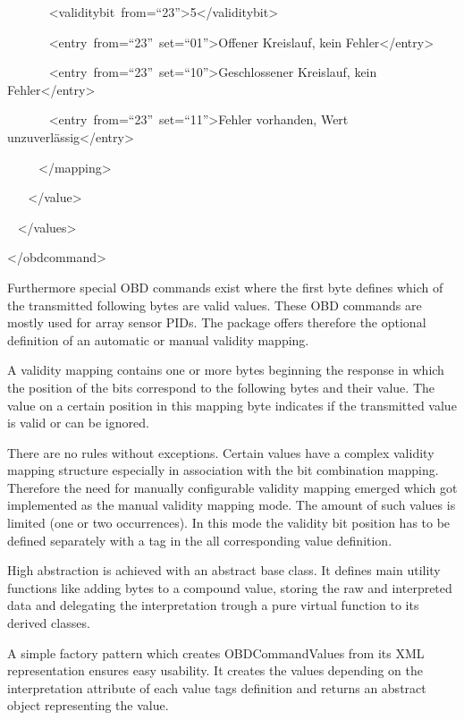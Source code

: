 {~ ~ ~ ~
}{\textless{}validitybit}{~}{from}{=}{``23''}{\textgreater{}}{5}{\textless{}/validitybit\textgreater{}}

{~ ~ ~ ~
}{\textless{}entry}{~}{from}{=}{``23''}{~}{set}{=}{``01''}{\textgreater{}}{Offener
Kreislauf, kein Fehler}{\textless{}/entry\textgreater{}}

{~ ~ ~ ~
}{\textless{}entry}{~}{from}{=}{``23''}{~}{set}{=}{``10''}{\textgreater{}}{Geschlossener
Kreislauf, kein Fehler}{\textless{}/entry\textgreater{}}

{~ ~ ~ ~
}{\textless{}entry}{~}{from}{=}{``23''}{~}{set}{=}{``11''}{\textgreater{}}{Fehler
vorhanden, Wert unzuverlässig}{\textless{}/entry\textgreater{}}

{~ ~ ~ }{\textless{}/mapping\textgreater{}}{~~~~~~~~~~~~~~~~}

{~ ~ }{\textless{}/value\textgreater{}}

{~ }{\textless{}/values\textgreater{}}

{\textless{}/obdcommand\textgreater{}}

{Furthermore special OBD commands exist where the first byte defines
which of the transmitted following bytes are valid values. These OBD
commands are mostly used for array sensor PIDs. The package offers
therefore the optional definition of an automatic or manual validity
mapping. }

{A validity mapping contains one or more bytes beginning the response in
which the position of the bits correspond to the following bytes and
their value. The value on a certain position in this mapping byte
indicates if the transmitted value is valid or can be ignored.}

{There are no rules without exceptions. Certain values have a complex
validity mapping structure especially in association with the bit
combination mapping. Therefore the need for manually configurable
validity mapping emerged which got implemented as the manual validity
mapping mode. The amount of such values is limited (one or two
occurrences). In this mode the validity bit position has to be defined
separately with a tag in the all corresponding value definition. }

{High abstraction is achieved with an abstract base class. It defines
main utility functions like adding bytes to a compound value, storing
the raw and interpreted data and delegating the interpretation trough a
pure virtual function to its derived classes. }

{A simple factory pattern which creates OBDCommandValues from its XML
representation ensures easy usability. It creates the values depending
on the interpretation attribute of each value tags definition and
returns an abstract object representing the value. }

